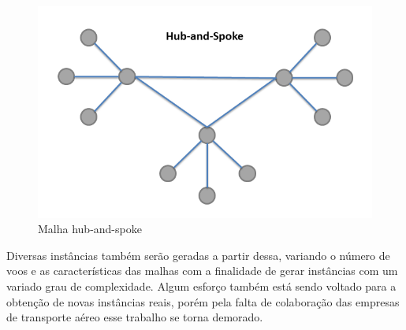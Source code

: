 \begin{figure}[ht]
	\centering
	\includegraphics[scale=0.35]{./img/hubandspoke}
	\caption{Malha hub-and-spoke}
	\label{fig:hubandspoke}
\end{figure}
  
  
  
	Diversas instâncias também serão geradas a partir dessa, variando o número de voos e as características das malhas com a finalidade de gerar instâncias com um variado grau de complexidade. Algum esforço também está sendo voltado para a obtenção de novas instâncias reais, porém pela falta de colaboração das empresas de transporte aéreo esse trabalho se torna demorado.
	
  
  